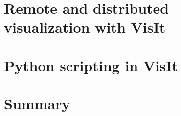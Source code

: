 \documentclass[xcolor=svgnames]{beamer}
\providecommand{\sectionpage}{\Large\centering \bf\mediumblue\insertsection}
\begin{document}
\section{Remote and distributed visualization with VisIt}
\advEnv
\frame{\sectionpage}
 
\resetEnv

\section{Python scripting in VisIt}
\advEnv
\frame{\sectionpage}
 
\resetEnv

\section{Summary}
\frame{\sectionpage}
 
\end{document}
